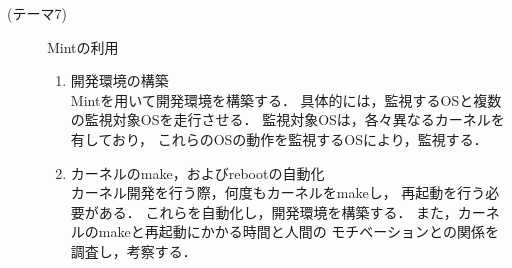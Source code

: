 \documentclass[12pt]{jsarticle}
\begin{document}
\begin{description}
\begin{enumerate}
        \end{enumerate}
    \item[(テーマ7)]Mintの利用
        \begin{enumerate}
            \item 開発環境の構築\\
                Mintを用いて開発環境を構築する．
                具体的には，監視するOSと複数の監視対象OSを走行させる．
                監視対象OSは，各々異なるカーネルを有しており，
                これらのOSの動作を監視するOSにより，監視する．
            \item カーネルのmake，およびrebootの自動化\\
                カーネル開発を行う際，何度もカーネルをmakeし，
                再起動を行う必要がある．
                これらを自動化し，開発環境を構築する．
                また，カーネルのmakeと再起動にかかる時間と人間の
                モチベーションとの関係を調査し，考察する．

        \end{enumerate}
\end{description}
\end{document}

